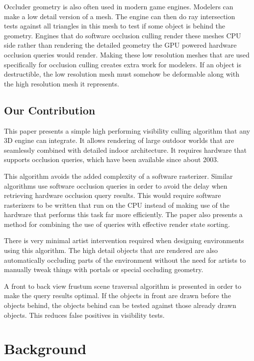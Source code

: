 \documentclass[12pt]{ucthesis}
\begin{document}
Occluder geometry is also often used in modern game engines.
Modelers can make a low detail version of a mesh.\cite{culling-bf}
The engine can then do ray intersection tests against all triangles in this mesh to test if some object is behind the geometry.\cite{Cryengine-culling-explained}
Engines that do software occlusion culling render these meshes CPU side rather than rendering the detailed geometry the GPU powered hardware occlusion queries would render.
Making these low resolution meshes that are used specifically for occlusion culling creates extra work for modelers.
If an object is destructible, the low resolution mesh must somehow be deformable along with the high resolution mesh it represents.

\section{Our Contribution}
\label{our-contribution}
This paper presents a simple high performing visibility culling algorithm that any 3D engine can integrate.
It allows rendering of large outdoor worlds that are seamlessly combined with detailed indoor architecture.
It requires hardware that supports occlusion queries, which have been available since about 2003.\cite{GpuGem-Queries}

This algorithm avoids the added complexity of a software rasterizer.
Similar algorithms use software occlusion queries in order to avoid the delay when retrieving hardware occlusion query results.\cite{culling-bf}
This would require software rasterizers to be written that run on the CPU instead of making use of the hardware that performs this task far more efficiently.
The paper also presents a method for combining the use of queries with effective render state sorting.

There is very minimal artist intervention required when designing environments using this algorithm.
The high detail objects that are rendered are also automatically occluding parts of the environment without the need for artists to manually tweak things with portals or special occluding geometry.

A front to back view frustum scene traversal algorithm is presented in order to make the query results optimal.
If the objects in front are drawn before the objects behind, the objects behind can be tested against those already drawn objects.
This reduces false positives in visibility tests.

\chapter{Background}
\label{background}
\end{document}
